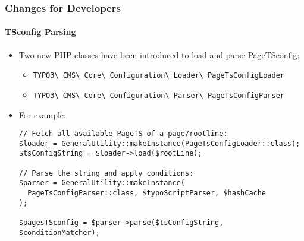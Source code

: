 
\begin{frame}[fragile]
	\frametitle{Changes for Developers}
	\framesubtitle{TSconfig Parsing}

	\lstset{basicstyle=\tiny\ttfamily}

	\begin{itemize}
		\item Two new PHP classes have been introduced to load and parse PageTSconfig:
			\begin{itemize}\smaller
				\item \texttt{TYPO3\textbackslash
					CMS\textbackslash
					Core\textbackslash
					Configuration\textbackslash
					Loader\textbackslash
					PageTsConfigLoader}
				\item \texttt{TYPO3\textbackslash
					CMS\textbackslash
					Core\textbackslash
					Configuration\textbackslash
					Parser\textbackslash
					PageTsConfigParser}
			\end{itemize}

		\item For example:
\begin{lstlisting}
// Fetch all available PageTS of a page/rootline:
$loader = GeneralUtility::makeInstance(PageTsConfigLoader::class);
$tsConfigString = $loader->load($rootLine);

// Parse the string and apply conditions:
$parser = GeneralUtility::makeInstance(
  PageTsConfigParser::class, $typoScriptParser, $hashCache
);

$pagesTSconfig = $parser->parse($tsConfigString, $conditionMatcher);
\end{lstlisting}

	\end{itemize}

\end{frame}


